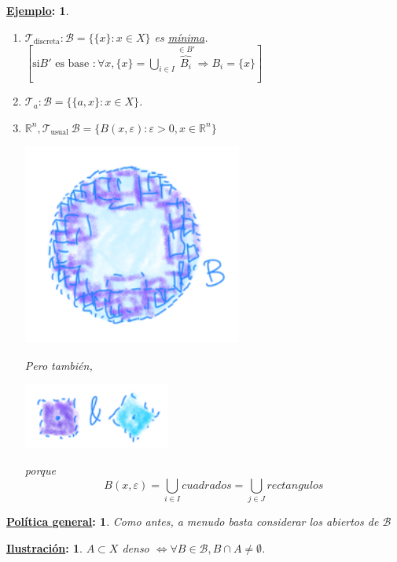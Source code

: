 \documentclass[10pt,a4paper,openright]{book}
\theoremstyle{break}
\newtheorem*{ej}{\underline{Ejemplo}:}
\newtheorem*{pg}{\underline{Política general}:}
\newtheorem*{il}{\underline{Ilustración}:}
\begin{document}
\begin{ej}
\begin{enumerate}
    \item $\mathcal{T}_{\text{discreta}} : \mathcal{B} = \{\{x\} : x \in X\}$ es \underline{mínima}. $\left[ \text{si} B' \text{ es base } : \forall x, \{x\} = \bigcup_{i \in  I} \overbrace{B_i}^{\in B'} \Rightarrow B_i = \{x\} \right]$ 
    \item $\mathcal{T}_a: \mathcal{B} = \{\{a, x\} : x \in X\}$.
    \item $\mathbb{R}^n, \mathcal{T}_{\text{usual}}\ \mathcal{B} = \{B\left( x, \varepsilon \right) : \varepsilon > 0, x \in \mathbb{R}^n\}$
    \begin{center}
        \includegraphics[scale=0.3]{images/base_rn} 
    \end{center}
    Pero también,
    \begin{center}
        \includegraphics[scale=0.3]{images/bases_alternativas_rn} 
    \end{center}
    porque
    \[
    B\left( x, \varepsilon \right) = \bigcup_{i \in  I} cuadrados = \bigcup_{j \in J} rectangulos
    \]
\end{enumerate}
\end{ej}

\begin{pg}
    Como antes, a menudo basta considerar los abiertos de $\mathcal{B}$ 
\end{pg}

\begin{il}
$A \subset X$ denso $\Leftrightarrow \forall B \in \mathcal{B}, B \cap A \neq \emptyset$.
\end{il}
\end{document}
